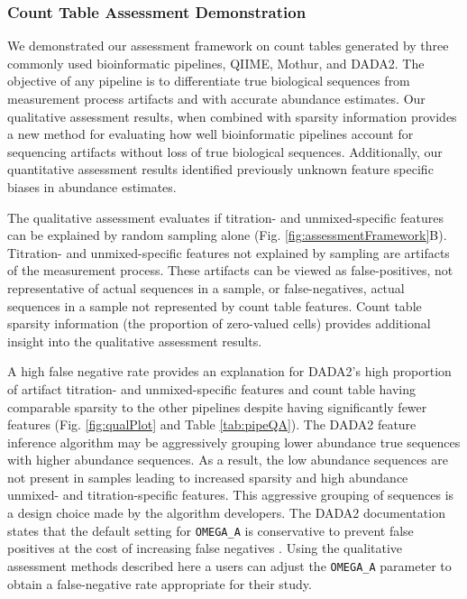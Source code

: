 \documentclass{bmcart}
\begin{document}
\subsubsection*{Count Table Assessment Demonstration}
We demonstrated our assessment framework on count tables generated by three commonly used bioinformatic pipelines, QIIME, Mothur, and DADA2.
The objective of any pipeline is to differentiate true biological sequences from measurement process artifacts and with accurate abundance estimates.
Our qualitative assessment results, when combined with sparsity information provides a
new method for evaluating how well bioinformatic pipelines account for sequencing artifacts without loss of true biological sequences.
Additionally, our quantitative assessment results identified previously unknown feature specific biases in abundance estimates.

The qualitative assessment evaluates if titration- and unmixed-specific features can be explained by random sampling alone (Fig. \ref{fig:assessmentFramework}B).
Titration- and unmixed-specific features not explained by sampling are artifacts of the measurement process.
These artifacts can be viewed as false-positives, not representative of actual sequences in a sample,
or false-negatives, actual sequences in a sample not represented by count table features.
Count table sparsity information (the proportion of zero-valued cells) provides
additional insight into the qualitative assessment results.

A high false negative rate provides an explanation for DADA2's high proportion
of artifact titration- and unmixed-specific features and count table having
comparable sparsity to the other pipelines despite having significantly fewer
features (Fig. \ref{fig:qualPlot} and Table \ref{tab:pipeQA}).
The DADA2 feature inference algorithm may be aggressively grouping
lower abundance true sequences with higher abundance sequences.
As a result, the low abundance sequences are not present in samples
leading to increased sparsity and high abundance unmixed- and titration-specific features.
This aggressive grouping of sequences is a design choice made by the algorithm developers.
The DADA2 documentation states that the default setting for \texttt{OMEGA\_A}
is conservative to prevent false positives at the cost of increasing false negatives \cite{callahan2016dada2}.
Using the qualitative assessment methods described here a users can
adjust the \texttt{OMEGA\_A} parameter to obtain a false-negative rate appropriate for their study.
\end{document}
